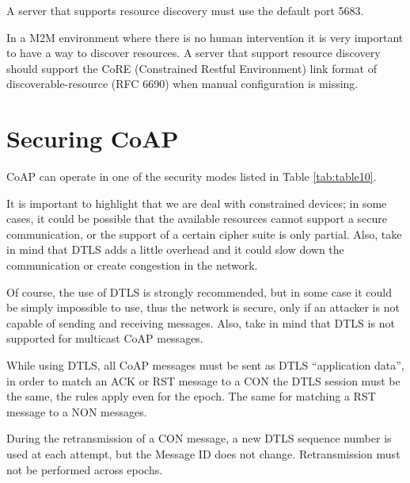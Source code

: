 	A server that supports resource discovery must use the default port 5683.\newline
	
	In a M2M environment where there is no human intervention it is very important to have a way to discover resources.\newline
	A server that support resource discovery should support the CoRE (Constrained Restful Environment) link format of discoverable-resource (RFC 6690) when manual configuration is missing.\newline
	
	\section{Securing CoAP}\label{sc:securing_coap}
	CoAP can operate in one of the security modes listed in Table \ref{tab:table10}.
	
	
	
	It is important to highlight that we are deal with constrained devices; in some cases, it could be possible that the available resources cannot support a secure communication, or the support of a certain cipher suite is only partial.\newline
	Also, take in mind that DTLS adds a little overhead and it could slow down the communication or create congestion in the network.\newline
	
	Of course, the use of DTLS is strongly recommended, but in some case it could be simply impossible to use, thus the network is secure, only if an attacker is not capable of sending and receiving messages.\newline
	Also, take in mind that DTLS is not supported for multicast CoAP messages.\newline
	
	While using DTLS, all CoAP messages must be sent as DTLS “application data”, in order to match an ACK or RST message to a CON the DTLS session must be the same, the rules apply even for the epoch.\newline
	The same for matching a RST message to a NON messages.\newline
	
	During the retransmission of a CON message, a new DTLS sequence number is used at each attempt, but the Message ID does not change.\newline
	Retransmission must not be performed across epochs.\newline
	
